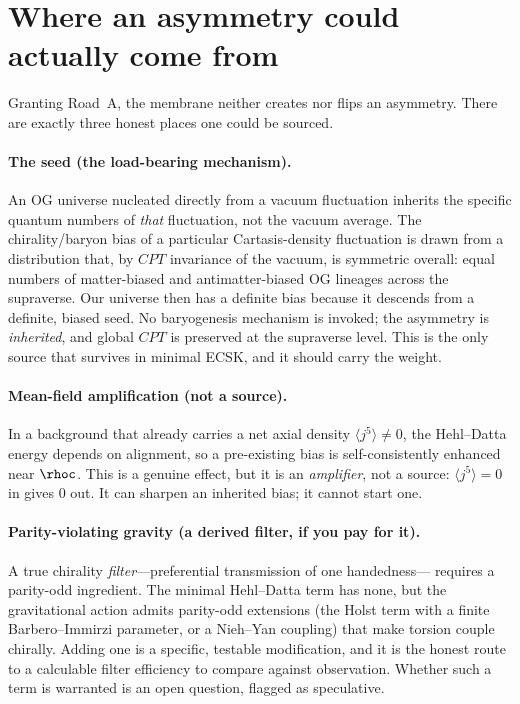 \section{Where an asymmetry could actually come from}

Granting Road~A, the membrane neither creates nor flips an asymmetry. There are
exactly three honest places one could be sourced.

\paragraph{The seed (the load-bearing mechanism).} An OG universe nucleated
directly from a vacuum fluctuation inherits the specific quantum numbers of
\emph{that} fluctuation, not the vacuum average. The chirality/baryon bias of a
particular Cartasis-density fluctuation is drawn from a distribution that, by
$CPT$ invariance of the vacuum, is symmetric overall: equal numbers of
matter-biased and antimatter-biased OG lineages across the supraverse. Our
universe then has a definite bias because it descends from a definite, biased
seed. No baryogenesis mechanism is invoked; the asymmetry is \emph{inherited},
and global $CPT$ is preserved at the supraverse level. This is the only source
that survives in minimal ECSK, and it should carry the weight.

\paragraph{Mean-field amplification (not a source).} In a background that already
carries a net axial density $\langle j^5\rangle \neq 0$, the Hehl--Datta energy
depends on alignment, so a pre-existing bias is self-consistently enhanced near
$\rhoc$. This is a genuine effect, but it is an \emph{amplifier}, not a source:
$\langle j^5\rangle = 0$ in gives $0$ out. It can sharpen an inherited bias; it
cannot start one.

\paragraph{Parity-violating gravity (a derived filter, if you pay for it).} A
true chirality \emph{filter}---preferential transmission of one handedness---
requires a parity-odd ingredient. The minimal Hehl--Datta term has none, but the
gravitational action admits parity-odd extensions (the Holst term with a finite
Barbero--Immirzi parameter, or a Nieh--Yan coupling) that make torsion couple
chirally. Adding one is a specific, testable modification, and it is the honest
route to a calculable filter efficiency to compare against observation. Whether
such a term is warranted is an open question, flagged as speculative.

